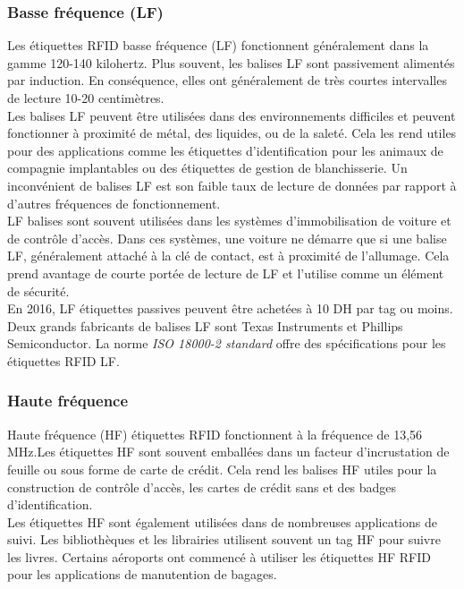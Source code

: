 \documentclass[11pt, a4paper, twoside]{book}
\begin{document}
\subsubsection{Basse fréquence (LF)}
Les étiquettes RFID basse fréquence (LF) fonctionnent généralement dans la gamme 120-140 kilohertz. Plus souvent, les balises LF sont passivement alimentés par induction. En conséquence, elles ont généralement de très courtes intervalles de lecture 10-20 centimètres.\\

Les balises LF peuvent être utilisées dans des environnements difficiles et peuvent fonctionner à proximité de métal, des liquides, ou de la saleté. Cela les rend utiles pour des applications comme les étiquettes d'identification pour les animaux de compagnie implantables ou des étiquettes de gestion de blanchisserie. Un inconvénient de balises LF est son faible taux de lecture de données par rapport à d'autres fréquences de fonctionnement.\\

LF balises sont souvent utilisées dans les systèmes d'immobilisation de voiture et de contrôle d'accès. Dans ces systèmes, une voiture ne démarre que si une balise LF, généralement attaché à la clé de contact, est à proximité de l'allumage. Cela prend avantage de courte portée de lecture de LF et l'utilise comme un élément de sécurité.\\

En 2016, LF étiquettes passives peuvent être achetées  à 10 DH par tag ou moins. Deux grands fabricants de balises LF sont Texas Instruments et Phillips Semiconductor. La norme \emph{ISO 18000-2 standard} offre des spécifications pour les étiquettes RFID LF.

\subsubsection{Haute fréquence}
Haute fréquence (HF) étiquettes RFID fonctionnent à la fréquence de 13,56 MHz.Les étiquettes HF sont souvent emballées dans un facteur d'incrustation de feuille ou sous forme de carte de crédit. Cela rend les balises HF utiles pour la construction de contrôle d'accès, les cartes de crédit sans et des badges d'identification.\\

Les étiquettes HF sont également utilisées dans de nombreuses applications de suivi. Les bibliothèques et les librairies utilisent souvent un tag HF pour suivre les livres. Certains aéroports ont commencé à utiliser les étiquettes HF RFID pour les applications de manutention de bagages.\\
\end{document}
